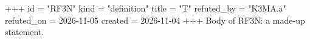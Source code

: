 +++
id = "RF3N"
kind = "definition"
title = "T"
refuted_by = "K3MA.a"
refuted_on = 2026-11-05
created = 2026-11-04
+++
Body of RF3N: a made-up statement.
